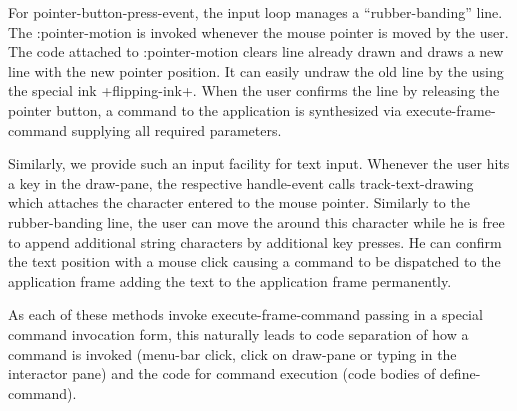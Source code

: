 \documentclass[twocolumn,a4paper]{article}
\newcommand {\code}[1]{{\sffamily #1}}
\let\class\code
\let\method\code
\let\constant\code
\let\keyword\code
\begin{document}
For \class{pointer-button-press-event}, the input loop manages a ``rubber-banding'' line. The \keyword{:pointer-motion} is invoked whenever the mouse pointer is moved by the user. The code attached to \keyword{:pointer-motion} clears line already drawn and draws a new line with the new pointer position. It can easily undraw the old line by the using the special ink \constant{+flipping-ink+}. When the user confirms the line by releasing the pointer button, a command to the application is synthesized via \method{execute-frame-command} supplying all required parameters.

Similarly, we provide such an input facility for text input. Whenever the user hits a key in the draw-pane, the respective \method{handle-event} calls \method{track-text-drawing} which attaches the character entered to the mouse pointer. Similarly to the rubber-banding line, the user can move the around this character while he is free to append additional string characters by additional key presses. He can confirm the text position with a mouse click causing a command to be dispatched to the application frame adding the text to the application frame permanently.

As each of these methods invoke \code{execute-frame-command} passing in a special command invocation form, this naturally leads to code separation of how a command is invoked (menu-bar click, click on draw-pane or typing in the interactor pane) and the code for command execution (code bodies of \method{define-command}).
\end{document}
